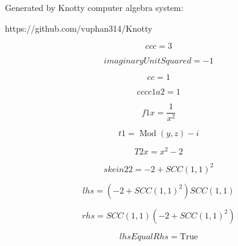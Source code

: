 \documentclass[letterpaper, 10pt]{extarticle}
\begin{document}
Generated by Knotty computer algebra system:

https://github.com/vuphan314/Knotty

\hrulefill

\begin{dmath*}
ccc =
    3
\end{dmath*}


\begin{dmath*}
imaginaryUnitSquared =
    -1
\end{dmath*}


\begin{dmath*}
cc =
    1
\end{dmath*}


\begin{dmath*}
cccc1a2 =
    1
\end{dmath*}


\begin{dmath*}
f1x =
    \frac{1}{x^{2}}
\end{dmath*}


\begin{dmath*}
t1 =
    \operatorname{Mod}{\left (y,z \right )} - i
\end{dmath*}


\begin{dmath*}
T2x =
    x^{2} - 2
\end{dmath*}


\begin{dmath*}
skein22 =
    -2 + SCC(1, 1)^{2}
\end{dmath*}


\begin{dmath*}
lhs =
    \left(-2 + SCC(1, 1)^{2}\right) SCC(1, 1)
\end{dmath*}


\begin{dmath*}
rhs =
    SCC(1, 1) \left(-2 + SCC(1, 1)^{2}\right)
\end{dmath*}


\begin{dmath*}
lhsEqualRhs =
    \mathrm{True}
\end{dmath*}
\end{document}
